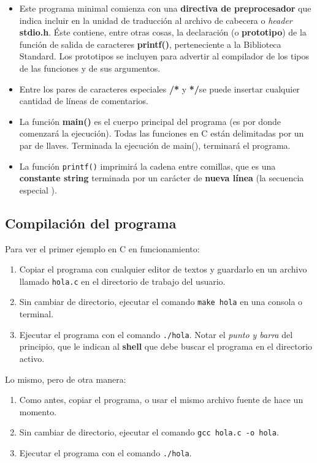 \begin{itemize}
\item Este programa minimal comienza con una \textbf{directiva de preprocesador} que indica incluir en la unidad de traducción al
archivo de cabecera o \textit{header} \textbf{stdio.h}. Éste contiene, entre otras
cosas, la declaración (o \textbf{prototipo}) de la función de
salida de caracteres \textbf{printf()}, perteneciente a la Biblioteca Standard. Los prototipos se incluyen para
advertir al compilador de los tipos de las funciones y de sus
argumentos. 
\item Entre los pares de caracteres especiales \textbf{/*} y \textbf{*/}se puede insertar cualquier cantidad de líneas de comentarios. 
\item La función \textbf{main()} es el cuerpo principal del programa
(es por donde comenzará la ejecución). Todas las funciones en C están delimitadas por un par de llaves. Terminada la ejecución de
main(), terminará el programa. 
\item La función \texttt{printf()} imprimirá la cadena entre comillas, que es
una \textbf{constante string} terminada por un carácter de
\textbf{nueva línea} (la secuencia especial ). 
\end{itemize}

\subsection{Compilación del programa}
Para ver el primer ejemplo en C en funcionamiento:

\begin{enumerate}
	\item Copiar el programa con cualquier editor de textos y guardarlo en un archivo llamado \texttt{hola.c} en el directorio de trabajo del usuario.
	\item Sin cambiar de directorio, ejecutar el comando \lstinline{make hola} en una consola o terminal.
	\item Ejecutar el programa con el comando \lstinline{./hola}. Notar el \textit{punto y barra} del principio, que le indican al \textbf{shell} que debe buscar el programa en el directorio activo.
\end{enumerate}

Lo mismo, pero de otra manera: 

\begin{enumerate}
\item Como antes, copiar el programa, o usar el mismo archivo fuente de hace un momento.
\item Sin cambiar de directorio, ejecutar el comando \lstinline{gcc hola.c -o hola}. 
\item Ejecutar el programa con el comando \lstinline{./hola}. 
\end{enumerate}


